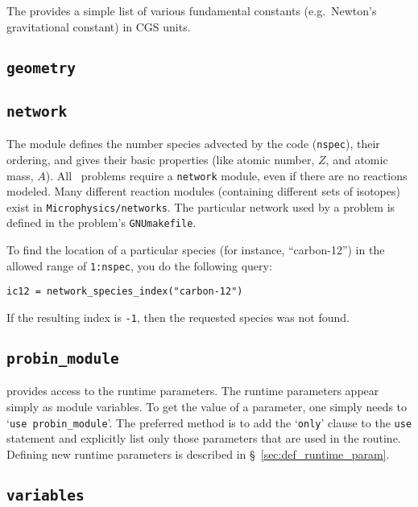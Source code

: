 The  provides a simple list of
various fundamental constants (e.g.\ Newton's gravitational constant)
in CGS units.

\subsection{{\tt geometry}}

\subsection{{\tt network}}

The  module defines the number species advected by the
code ({\tt nspec}), their ordering, and gives their basic properties
(like atomic number, $Z$, and atomic mass, $A$).  All \maestro\ problems
require a {\tt network} module, even if there are no reactions
modeled.  Many different reaction modules (containing different sets
of isotopes) exist in {\tt Microphysics/networks}.  The particular network
used by a problem is defined in the problem's {\tt GNUmakefile}.

To find the location of a particular species (for instance, ``carbon-12'')
in the allowed range of {\tt 1:nspec}, you do the following query:
\begin{lstlisting}[language={[95]fortran},mathescape=false]
  ic12 = network_species_index("carbon-12")
\end{lstlisting}
If the resulting index is {\tt -1}, then the requested species was not
found.

\subsection{{\tt probin\_module}}

\label{sec:probin}

 provides access to the runtime parameters.
The runtime parameters appear simply as module variables.  To get the 
value of a parameter, one simply needs to `{\tt use probin\_module}'.
The preferred method is to add the `{\tt only}' clause to the
{\tt use} statement and explicitly list only those parameters that
are used in the routine.  Defining new runtime parameters is
described in \S~\ref{sec:def_runtime_param}.

\subsection{{\tt variables}}


